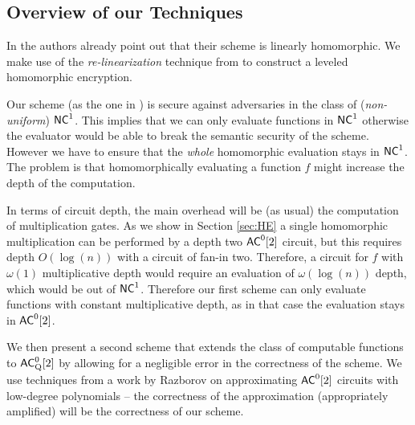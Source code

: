 
\subsection{Overview of our Techniques}

In \cite{fgcrypto} the authors already point out that their scheme is 
linearly homomorphic. We make use of the {\em re-linearization} technique 
from \cite{fhe-lwe} to construct a leveled homomorphic encryption. 

Our scheme (as the one in \cite{fgcrypto}) is secure against adversaries in the class of (\textit{non-uniform}) ${\mathsf{NC}}^1$. This implies that we can only evaluate functions in ${\mathsf{NC}}^1$ otherwise the evaluator would be able to break the semantic security of the scheme.
However we have to ensure that the \textit{whole} homomorphic evaluation stays in ${\mathsf{NC}}^1$. The problem is that homomorphically evaluating a function $f$ might 
increase the depth of the computation. 

In terms of circuit depth, the main overhead will be (as usual)
the computation of multiplication gates. As we 
 show in Section \ref{sec:HE} a single homomorphic multiplication can be performed by a depth two ${\mathsf{AC}}^0[2]$ circuit, but this requires depth $O(\log(n))$ with a circuit of fan-in two. Therefore, a circuit for $f$ with $\omega(1)$ multiplicative depth would require an evaluation of $\omega(\log(n))$ depth, which would be out of ${\mathsf{NC}}^1$. Therefore our first scheme can only evaluate
 functions with constant multiplicative depth, as in that case the evaluation stays in ${\mathsf{AC}}^0[2]$. 
 
We then present a second scheme that extends the class of computable functions 
to ${\mathsf{AC}}^0_{\text{Q}}[2]$ by allowing for a negligible error in the correctness of the scheme. We use techniques from a work by Razborov \cite{razborov1987lower} on approximating ${\mathsf{AC}}^0[2]$ circuits with low-degree polynomials -- the correctness of the approximation (appropriately amplified) will be the correctness of our scheme. 



